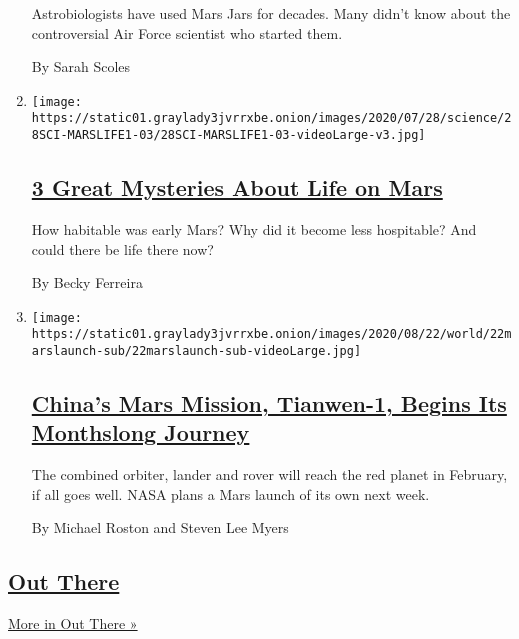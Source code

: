 \begin{enumerate}
  Astrobiologists have used Mars Jars for decades. Many didn't know
  about the controversial Air Force scientist who started them.

  By Sarah Scoles
\item
  \texttt{[image: https://static01.graylady3jvrrxbe.onion/images/2020/07/28/science/28SCI-MARSLIFE1-03/28SCI-MARSLIFE1-03-videoLarge-v3.jpg]}

  \hypertarget{3-great-mysteries-about-life-on-mars}{%
  \subsection{\texorpdfstring{\href{/2020/07/24/science/mars-life-water.html}{3
  Great Mysteries About Life on
  Mars}}{3 Great Mysteries About Life on Mars}}\label{3-great-mysteries-about-life-on-mars}}

  How habitable was early Mars? Why did it become less hospitable? And
  could there be life there now?

  By Becky Ferreira
\item
  \texttt{[image: https://static01.graylady3jvrrxbe.onion/images/2020/08/22/world/22marslaunch-sub/22marslaunch-sub-videoLarge.jpg]}

  \hypertarget{chinas-mars-mission-tianwen-1-begins-its-monthslong-journey}{%
  \subsection{\texorpdfstring{\href{/2020/07/22/science/mars-china-launch.html}{China's
  Mars Mission, Tianwen-1, Begins Its Monthslong
  Journey}}{China's Mars Mission, Tianwen-1, Begins Its Monthslong Journey}}\label{chinas-mars-mission-tianwen-1-begins-its-monthslong-journey}}

  The combined orbiter, lander and rover will reach the red planet in
  February, if all goes well. NASA plans a Mars launch of its own next
  week.

  By Michael Roston and Steven Lee Myers
\end{enumerate}

\hypertarget{out-there-2}{%
\subsection{\texorpdfstring{\href{/column/out-there}{Out
There}}{Out There}}\label{out-there-2}}

\href{/column/out-there}{More in Out There »}

